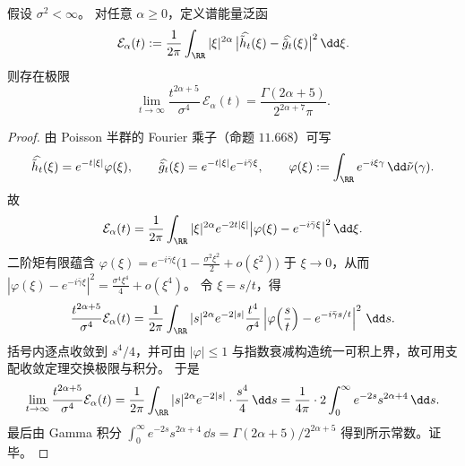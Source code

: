\begin{theorem}[任意阶谱能量的普适极限常数]\label{thm:xi-poisson-cauchy-spectral-energy-universal-constant}
假设 \(\sigma^2<\infty\)。
对任意 \(\alpha\ge 0\)，定义谱能量泛函
\[
\mathcal E_\alpha(t):=\frac{1}{2\pi}\int_{\RR}|\xi|^{2\alpha}\,
\bigl|\widehat{\tilde h_t}(\xi)-\widehat{\tilde g_t}(\xi)\bigr|^2\,\dd \xi.
\]
则存在极限
\[
\lim_{t\to\infty}\frac{t^{2\alpha+5}}{\sigma^4}\,\mathcal E_\alpha(t)
=\frac{\Gamma(2\alpha+5)}{2^{2\alpha+7}\pi}.
\]
\end{theorem}
\begin{proof}
由 Poisson 半群的 Fourier 乘子（命题 \(11.668\)）可写
\[
\widehat{\tilde h_t}(\xi)=e^{-t|\xi|}\varphi(\xi),
\qquad
\widehat{\tilde g_t}(\xi)=e^{-t|\xi|}e^{-i\bar\gamma\xi},
\qquad
\varphi(\xi):=\int_{\RR}e^{-i\xi\gamma}\,\dd\tilde\nu(\gamma).
\]
故
\[
\mathcal E_\alpha(t)=\frac{1}{2\pi}\int_{\RR}|\xi|^{2\alpha}e^{-2t|\xi|}
\bigl|\varphi(\xi)-e^{-i\bar\gamma\xi}\bigr|^2\,\dd\xi.
\]
二阶矩有限蕴含 \(\varphi(\xi)=e^{-i\bar\gamma\xi}\bigl(1-\frac{\sigma^2\xi^2}{2}+o(\xi^2)\bigr)\) 于 \(\xi\to 0\)，从而
\(
|\varphi(\xi)-e^{-i\bar\gamma\xi}|^2=\frac{\sigma^4\xi^4}{4}+o(\xi^4)
\)。
令 \(\xi=s/t\)，得
\[
\frac{t^{2\alpha+5}}{\sigma^4}\mathcal E_\alpha(t)
=\frac{1}{2\pi}\int_{\RR}|s|^{2\alpha}e^{-2|s|}
\frac{t^4}{\sigma^4}\left|\varphi\!\left(\frac{s}{t}\right)-e^{-i\bar\gamma s/t}\right|^2\,\dd s.
\]
括号内逐点收敛到 \(s^4/4\)，并可由 \(|\varphi|\le 1\) 与指数衰减构造统一可积上界，故可用支配收敛定理交换极限与积分。
于是
\[
\lim_{t\to\infty}\frac{t^{2\alpha+5}}{\sigma^4}\mathcal E_\alpha(t)
=\frac{1}{2\pi}\int_{\RR}|s|^{2\alpha}e^{-2|s|}\cdot\frac{s^4}{4}\,\dd s
=\frac{1}{4\pi}\cdot 2\int_0^\infty e^{-2s}s^{2\alpha+4}\,\dd s.
\]
最后由 Gamma 积分 \(\int_0^\infty e^{-2s}s^{2\alpha+4}\,\dd s=\Gamma(2\alpha+5)/2^{2\alpha+5}\) 得到所示常数。证毕。
\end{proof}

